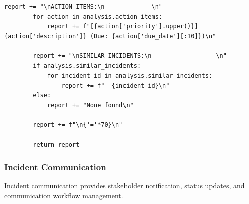 \begin{lstlisting}[style=python, caption={Post-incident analysis with root cause identification}]
        report += "\nACTION ITEMS:\n-------------\n"
        for action in analysis.action_items:
            report += f"[{action['priority'].upper()}] {action['description']} (Due: {action['due_date'][:10]})\n"

        report += "\nSIMILAR INCIDENTS:\n------------------\n"
        if analysis.similar_incidents:
            for incident_id in analysis.similar_incidents:
                report += f"- {incident_id}\n"
        else:
            report += "None found\n"

        report += f"\n{'='*70}\n"

        return report
\end{lstlisting}

\subsubsection{Incident Communication}

Incident communication provides stakeholder notification, status updates, and communication workflow management.


